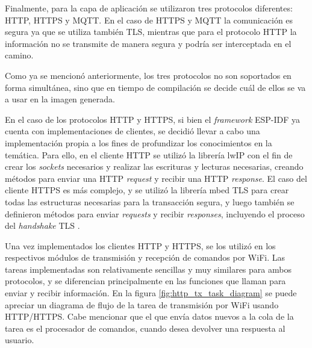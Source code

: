 Finalmente, para la capa de aplicación se utilizaron tres protocolos diferentes: HTTP, HTTPS y MQTT. En el caso de HTTPS y MQTT la comunicación es segura ya que se utiliza también TLS, mientras que para el protocolo HTTP la información no se transmite de manera segura y podría ser interceptada en el camino.

Como ya se mencionó anteriormente, los tres protocolos no son soportados en forma simultánea, sino que en tiempo de compilación se decide cuál de ellos se va a usar en la imagen generada.

En el caso de los protocolos HTTP y HTTPS, si bien el \emph{framework} ESP-IDF ya cuenta con implementaciones de clientes, se decidió llevar a cabo una implementación propia a los fines de profundizar los conocimientos en la temática. Para ello, en el cliente HTTP se utilizó la librería lwIP con el fin de crear los \emph{sockets} necesarios y realizar las escrituras y lecturas necesarias, creando métodos para enviar una HTTP \emph{request} y recibir una HTTP \emph{response}. El caso del cliente HTTPS es más complejo, y se utilizó la librería mbed TLS para crear todas las estructuras necesarias para la transacción segura, y luego también se definieron métodos para enviar \emph{requests} y recibir \emph{responses}, incluyendo el proceso del \emph{handshake} TLS \citep{tls_handshake}.

Una vez implementados los clientes HTTP y HTTPS, se los utilizó en los respectivos módulos de transmisión y recepción de comandos por WiFi. Las tareas implementadas son relativamente sencillas y muy similares para ambos protocolos, y se diferencian principalmente en las funciones que llaman para enviar y recibir información. En la figura \ref{fig:http_tx_task_diagram} se puede apreciar un diagrama de flujo de la tarea de transmisión por WiFi usando HTTP/HTTPS. Cabe mencionar que el que envía datos nuevos a la cola de la tarea es el procesador de comandos, cuando desea devolver una respuesta al usuario.

